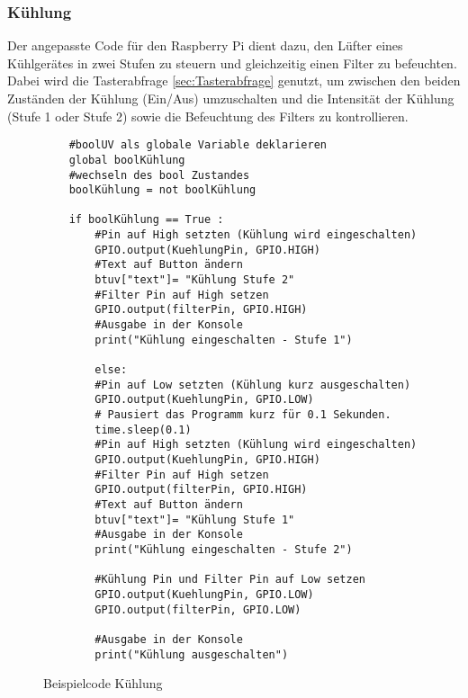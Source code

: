\subsubsection{Kühlung}\label{sec: kühlung test}
Der angepasste Code für den Raspberry Pi dient dazu, den Lüfter eines Kühlgerätes in zwei Stufen zu steuern und gleichzeitig einen Filter zu befeuchten. Dabei wird die Tasterabfrage \ref{sec:Tasterabfrage} genutzt, um zwischen den beiden Zuständen der Kühlung (Ein/Aus) umzuschalten und die Intensität der Kühlung (Stufe 1 oder Stufe 2) sowie die Befeuchtung des Filters zu kontrollieren.\\
\vspace{3mm}
\begin{figure}[H]
    \centering
    \begin{verbatim}
    #boolUV als globale Variable deklarieren
    global boolKühlung
    #wechseln des bool Zustandes
    boolKühlung = not boolKühlung

    if boolKühlung == True :
        #Pin auf High setzten (Kühlung wird eingeschalten)
        GPIO.output(KuehlungPin, GPIO.HIGH)
        #Text auf Button ändern
        btuv["text"]= "Kühlung Stufe 2" 
        #Filter Pin auf High setzen
        GPIO.output(filterPin, GPIO.HIGH)
        #Ausgabe in der Konsole
        print("Kühlung eingeschalten - Stufe 1")
        
        else:
        #Pin auf Low setzten (Kühlung kurz ausgeschalten)
        GPIO.output(KuehlungPin, GPIO.LOW)
        # Pausiert das Programm kurz für 0.1 Sekunden.
        time.sleep(0.1)
        #Pin auf High setzten (Kühlung wird eingeschalten)
        GPIO.output(KuehlungPin, GPIO.HIGH)
        #Filter Pin auf High setzen
        GPIO.output(filterPin, GPIO.HIGH)
        #Text auf Button ändern
        btuv["text"]= "Kühlung Stufe 1"
        #Ausgabe in der Konsole
        print("Kühlung eingeschalten - Stufe 2")

		#Kühlung Pin und Filter Pin auf Low setzen
		GPIO.output(KuehlungPin, GPIO.LOW)
		GPIO.output(filterPin, GPIO.LOW)
		
		#Ausgabe in der Konsole
		print("Kühlung ausgeschalten")        
    \end{verbatim}
    \caption{Beispielcode Kühlung}
\end{figure}
\newpage
